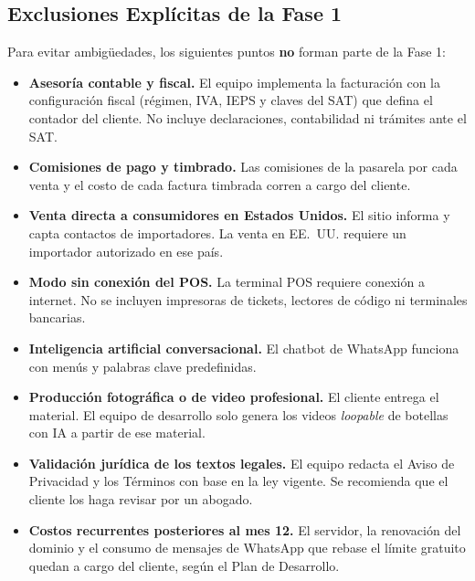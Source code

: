 \documentclass[11pt,letterpaper]{article}
\begin{document}
\subsection{Exclusiones Explícitas de la Fase 1}
Para evitar ambigüedades, los siguientes puntos \textbf{no} forman parte de la Fase 1:
\begin{itemize}[leftmargin=1.5em]
    \item \textbf{Asesoría contable y fiscal.} El equipo implementa la facturación con la configuración fiscal (régimen, IVA, IEPS y claves del SAT) que defina el contador del cliente. No incluye declaraciones, contabilidad ni trámites ante el SAT.
    \item \textbf{Comisiones de pago y timbrado.} Las comisiones de la pasarela por cada venta y el costo de cada factura timbrada corren a cargo del cliente.
    \item \textbf{Venta directa a consumidores en Estados Unidos.} El sitio informa y capta contactos de importadores. La venta en EE.~UU. requiere un importador autorizado en ese país.
    \item \textbf{Modo sin conexión del POS.} La terminal POS requiere conexión a internet. No se incluyen impresoras de tickets, lectores de código ni terminales bancarias.
    \item \textbf{Inteligencia artificial conversacional.} El chatbot de WhatsApp funciona con menús y palabras clave predefinidas.
    \item \textbf{Producción fotográfica o de video profesional.} El cliente entrega el material. El equipo de desarrollo solo genera los videos \textit{loopable} de botellas con IA a partir de ese material.
    \item \textbf{Validación jurídica de los textos legales.} El equipo redacta el Aviso de Privacidad y los Términos con base en la ley vigente. Se recomienda que el cliente los haga revisar por un abogado.
    \item \textbf{Costos recurrentes posteriores al mes 12.} El servidor, la renovación del dominio y el consumo de mensajes de WhatsApp que rebase el límite gratuito quedan a cargo del cliente, según el Plan de Desarrollo.
\end{itemize}
\end{document}
